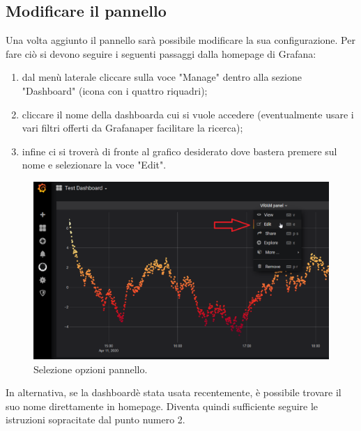     \subsection{Modificare il pannello}
        Una volta aggiunto il pannello sarà possibile modificare la sua configurazione. Per fare ciò si devono seguire i seguenti passaggi dalla homepage di Grafana\glo:
        \begin{enumerate}
            \item dal menù laterale cliccare sulla voce "Manage" dentro alla sezione "Dashboard" (icona con i quattro riquadri);
            \item cliccare il nome della dashboard\glosp a cui si vuole accedere (eventualmente usare i vari filtri offerti da Grafana\glosp per facilitare la ricerca);
            \item infine ci si troverà di fronte al grafico desiderato dove bastera premere sul nome e selezionare la voce "Edit".
        \end{enumerate}
        \begin{figure}[H]
            \includegraphics[width=\textwidth,height=\textheight,keepaspectratio]{img/modificare_pannello.png}
            \caption{Selezione opzioni pannello.}
        \end{figure}
        In alternativa, se la dashboard\glosp è stata usata recentemente, è possibile trovare il suo nome direttamente in homepage. Diventa quindi sufficiente seguire le istruzioni sopracitate dal punto numero 2.
